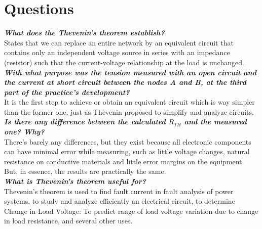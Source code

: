 \documentclass[letterpaper]{article}
\begin{document}
\section{Questions}
\textit{\textbf{What does the Thevenin’s theorem establish?}}\\
States that we can replace an entire network by an equivalent circuit that contains only an
independent voltage source in series with an impedance (resistor) such that the current-voltage
relationship at the load is unchanged.\\
\textit{\textbf{With what purpose was the tension measured with an open circuit and the current at short circuit between the nodes A and B, at the third part of the practice’s development?}}\\
It is the first step to achieve or obtain an equivalent circuit which is way simpler than the
former one, just as Thevenin proposed to simplify and analyze circuits. \\
\textit{\textbf{Is there any difference between the calculated $R_{TH}$ and the measured one? Why?}}\\
There’s barely any differences, but they exist because all electronic components can have minimal
error while measuring, such as little voltage changes, natural resistance on conductive materials
and little error margins on the equipment. But, in essence, the results are practically the
same.\\
\textit{\textbf{What is Thevenin’s theorem useful for?}}\\
Thevenin's theorem is used to find fault current in fault analysis of power systems, to study and
analyze efficiently an electrical circuit, to determine Change in Load Voltage: To predict range
of load voltage variation due to change in load resistance, and several other uses.
\end{document}

